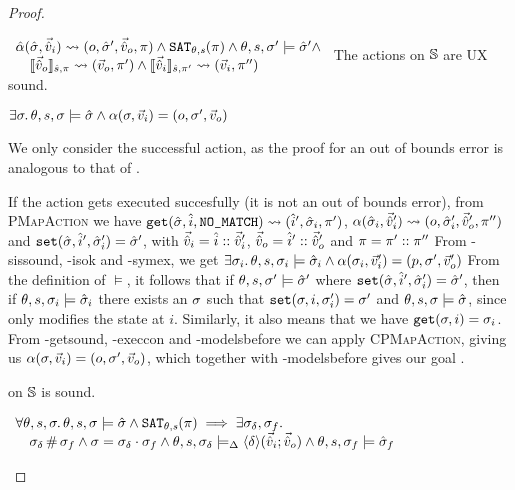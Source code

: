 \begin{proof}

\pfassume \begin{hypvlist}
 $
\begin{array}{l}
\ppexec{\hat\alpha}{\sst,\sins}{o,\sst',\souts, \pc} \land \SAT(\pc) \land \theta,s,\st'\models\sst' \land \\
\quad \expeval[\hat s,\pc]{\souts}\rightsquigarrow(\outs,\pc')\land \expeval[\hat s,\pc']{\sins}\rightsquigarrow(\ins,\pc'')
\end{array}
$
 The actions on $\mmdl$ are UX sound.
\end{hypvlist}
\pfprove \begin{goalvlist}
 $\exists \st\ldotp \theta,s,\st\models\sst \land \ppexecc{\alpha}{\st,\ins}{o,\st',\outs}$
\end{goalvlist}

We only consider the successful action, as the proof for an out of bounds error is analogous to that of \PMap.

\begin{hypvlist}
 If the action gets executed succesfully (it is not an out of bounds error), from \textsc{PMapAction} we have $\ppget{\sst,\sym i,\code{NO\_MATCH}}{\sym i',\sst_i,\pc'}$, $\ppexec{\alpha}{\sst_i,\sins'}{o,\sst'_i,\souts',\pc''}$ and ${\ppset{\sst,\sym i',\sst'_i}{\sst'}}$, with $\sins=\sym i::\sins'$, $\souts=\sym i'::\souts'$ and $\pc=\pc'::\pc''$
 From \hyp{sissound}, \hyp{isok} and \hyp{symex}, we get $\exists \st_i\ldotp \theta,s,\st_i\models\sst_i \land \ppexecc{\alpha}{\st_i,\ins'}{p,\st',\outs'}$
 From the definition of $\models$, it follows that if $\theta,s,\st'\models\sst'$ where $\ppset{\sst,\sym i',\sst'_i}{\sst'}$, then if $\theta,s,\st_i\models\sst_i$ there exists an $\st$ such that $\ppset{\st,i,\st_i'}{\st'}$ and $\theta,s,\st\models\sst$, since  only modifies the state at $i$.
 Similarly, it also means that we have $\ppgetc{\st,i}{\st_i}$.
 From \hyp{getsound}, \hyp{execcon} and \hyp{modelsbefore} we can apply \textsc{CPMapAction}, giving us ${\ppexecc{\alpha}{\st,\ins}{o,\st',\outs}}$, which together with \hyp{modelsbefore} gives our goal .
\end{hypvlist}


\pfassume \begin{hypvlist}
 
 \consume{} on $\mmdl$ is sound.
\end{hypvlist}
\pfprove \begin{goalvlist}
 $\begin{array}{l}
\forall \theta,s,\st\ldotp \theta,s,\st\models \sst \land \SAT(\pc) \implies \exists \st_\delta, \st_f \ldotp\\
\quad  \st_\delta\disj\st_f \land \st=\st_\delta\cdot\st_f \land \theta, s, \st_\delta \modelsp \corepred{\delta}{\sins}{\souts} \land \theta,s,\st_f\models \sst_f 
\end{array}$
\end{goalvlist}


\end{proof}
